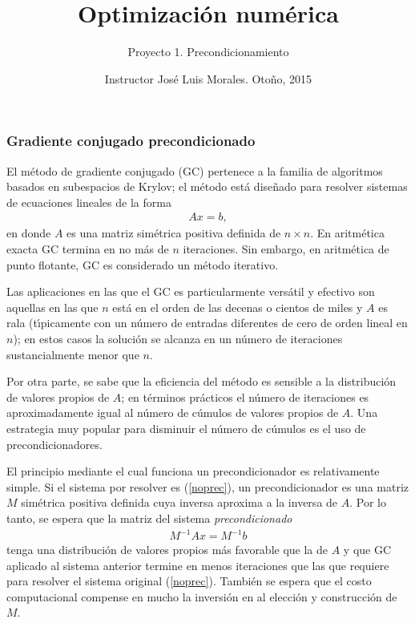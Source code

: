 \documentclass[12pt]{article}
\begin{document}
\title{Optimizaci\'on num\'erica}
\author{Proyecto 1. Precondicionamiento}
\date{Instructor Jos\'e Luis Morales. Oto\~no, 2015}
\maketitle


\subsubsection*{Gradiente conjugado precondicionado}
 El m\'etodo de gradiente conjugado (GC) pertenece a la familia de algoritmos basados en subespacios de Krylov; el m\'etodo est\'a dise\~nado para resolver sistemas de ecuaciones lineales de la forma
 \begin{eqnarray} \label{noprec}
      Ax = b,
 \end{eqnarray}
  en donde $A$ es una matriz sim\'etrica positiva definida de $n \times n$. En aritm\'etica exacta GC termina en no m\'as de $n$ iteraciones. Sin embargo, en aritm\'etica de punto flotante, GC es considerado un m\'etodo iterativo.
 
  Las aplicaciones en las que el GC es particularmente vers\'atil y efectivo son aquellas en las que $n$ est\'a en el orden de las decenas o cientos de miles y $A$ es rala (t\'{\i}picamente con un n\'umero de entradas diferentes de cero de orden lineal en $n$); en estos casos la soluci\'on se alcanza en un n\'umero de iteraciones sustancialmente menor que $n$.
  
  Por otra parte, se sabe que la  eficiencia del m\'etodo es sensible a la distribuci\'on de valores propios de $A$; en t\'erminos pr\'acticos el n\'umero de iteraciones es aproximadamente igual al n\'umero de c\'umulos de valores propios de $A$. Una estrategia muy popular para disminuir el n\'umero de c\'umulos es el uso de precondicionadores. 
  
 El principio mediante el cual funciona un precondicionador es relativamente simple. Si el sistema por resolver es (\ref{noprec}), un precondicionador es una matriz $M$ sim\'etrica positiva definida cuya inversa aproxima a la inversa de $A$. Por lo tanto, se espera que la matriz del  sistema {\em precondicionado}
 \begin{eqnarray} \label{prec}
          M^{-1} A x = M^{-1}b 
 \end{eqnarray}
 tenga una distribuci\'on de valores propios m\'as favorable que la de $A$ y que GC aplicado al sistema anterior termine en menos iteraciones que las que requiere para resolver el sistema original (\ref{noprec}). Tambi\'en se espera que el costo computacional compense en mucho la inversi\'on en al elecci\'on y construcci\'on de $M$.
 
\end{document}
